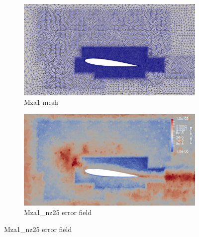 \begin{figure}[H]
	\begin{subfigure}[b]{0.475\textwidth}
		\centering
		\includegraphics[width=1\textwidth]{figures/zonal_adapt_results/Mesh_and_error_plots_Re200k/Mza1_inplane.png}
		\caption{Mza1 mesh}
		\label{fig:zonal_Mza1_mesh_Re200k}
	\end{subfigure}
	\begin{subfigure}[b]{0.475\textwidth}
		\centering
		\includegraphics[width=1\textwidth]{figures/zonal_adapt_results/Mesh_and_error_plots_Re200k/Mza1_error.png}
		\caption{Mza1\_nz25 error field}
		\label{fig:zonal_Mza1_error_Re200k}
	\end{subfigure}
	

\end{figure}
